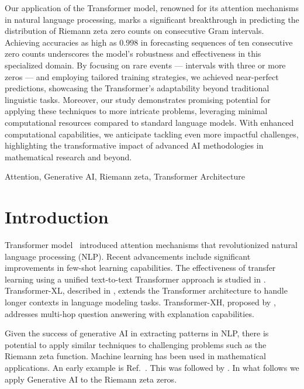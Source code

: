 \documentclass[journal]{IEEEtai}
\begin{document}
\begin{IEEEImpStatement}
Our application of the Transformer model, renowned for its attention mechanisms in natural language processing, marks a significant breakthrough in predicting the distribution of Riemann zeta zero counts on consecutive Gram intervals. Achieving accuracies as high as $0.998$ in forecasting sequences of ten consecutive zero counts underscores the model's robustness and effectiveness in this specialized domain. By focusing on rare events — intervals with three or more zeros — and employing tailored training strategies, we achieved near-perfect predictions, showcasing the Transformer's adaptability beyond traditional linguistic tasks. Moreover, our study demonstrates promising potential for applying these techniques to more intricate problems, leveraging minimal computational resources compared to standard language models. With enhanced computational capabilities, we anticipate tackling even more impactful challenges, highlighting the transformative impact of advanced AI methodologies in mathematical research and beyond.

\end{IEEEImpStatement}

\begin{IEEEkeywords}
Attention, Generative AI, Riemann zeta, Transformer Architecture
\end{IEEEkeywords}



\section{Introduction}

  Transformer model~\cite{vaswani2017attention} introduced attention mechanisms that revolutionized natural language processing (NLP).
Recent advancements \cite{radford2019language,brown2020language} include significant improvements in few-shot learning capabilities.
The effectiveness of transfer learning using a unified text-to-text Transformer approach is studied in \cite{raffel2019exploring}.
Transformer-XL, described in \cite{dai2019transformerxl}, extends the Transformer architecture to handle longer contexts in language modeling tasks.
Transformer-XH, proposed by \cite{zhang2019transformerxh}, addresses multi-hop question answering with explanation capabilities. 

Given the success of generative AI in extracting patterns in NLP, there is potential to apply similar techniques to challenging problems such as the Riemann zeta function.
Machine learning has been used in mathematical applications. An early example is  Ref.~\cite{osneural}. This was followed by \cite{he2022sato,HeMLNF,HeStringLandscape,
Vartziotis2023,Kim2022}. In what follows we apply Generative AI to the Riemann zeta zeros.
\end{document}
